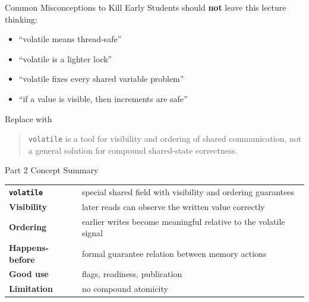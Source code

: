 \documentclass[aspectratio=169,11pt]{beamer}
\begin{document}
	\begin{frame}{Common Misconceptions to Kill Early}
		Students should \textbf{not} leave this lecture thinking:
		
		\begin{itemize}
			\item ``volatile means thread-safe''
			\item ``volatile is a lighter lock''
			\item ``volatile fixes every shared variable problem''
			\item ``if a value is visible, then increments are safe''
		\end{itemize}
		
		\vspace{0.35cm}
		
		\begin{alertblock}{Replace with}
			\begin{quote}
				\texttt{volatile} is a tool for visibility and ordering of shared communication, not a general solution for compound shared-state correctness.
			\end{quote}
		\end{alertblock}
	\end{frame}
	
	\begin{frame}{Part 2 Concept Summary}
		\centering
		\begin{tabular}{>{\bfseries}m{3cm} m{7.3cm}}
			\texttt{volatile} & special shared field with visibility and ordering guarantees \\
			Visibility & later reads can observe the written value correctly \\
			Ordering & earlier writes become meaningful relative to the volatile signal \\
			Happens-before & formal guarantee relation between memory actions \\
			Good use & flags, readiness, publication \\
			Limitation & no compound atomicity \\
		\end{tabular}
	\end{frame}
	
\end{document}
